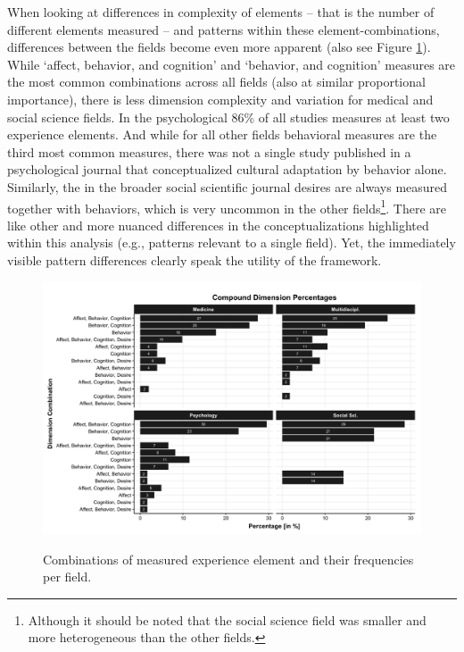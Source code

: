 \documentclass[man, 12pt, a4paper]{apa7}
\begin{document}
When looking at differences in complexity of elements -- that is the number of different elements measured -- and patterns within these element-combinations, differences between the fields become even more apparent (also see Figure \ref{fig:FieldCombs}). While `affect, behavior, and cognition' and `behavior, and cognition' measures are the most common combinations across all fields (also at similar proportional importance), there is less dimension complexity and variation for medical and social science fields. In the psychological 86\% of all studies measures at least two experience elements. And while for all other fields behavioral measures are the third most common measures, there was not a single study published in a psychological journal that conceptualized cultural adaptation by behavior alone. Similarly, the in the broader social scientific journal desires are always measured together with behaviors, which is very uncommon in the other fields\footnote{Although it should be noted that the social science field was smaller and more heterogeneous than the other fields.}. There are like other and more nuanced differences in the conceptualizations highlighted within this analysis (e.g., patterns relevant to a single field). Yet, the immediately visible pattern differences clearly speak the utility of the framework. 

\begin{figure}[h]
\centering
\caption{Combinations of measured experience element and their frequencies per field.}
\includegraphics[width=\textwidth]{Figures/PsychDisciplineABCDCombFreq-1.png}
\label{fig:FieldCombs}
\end{figure}

\vspace{1em}
\end{document}
